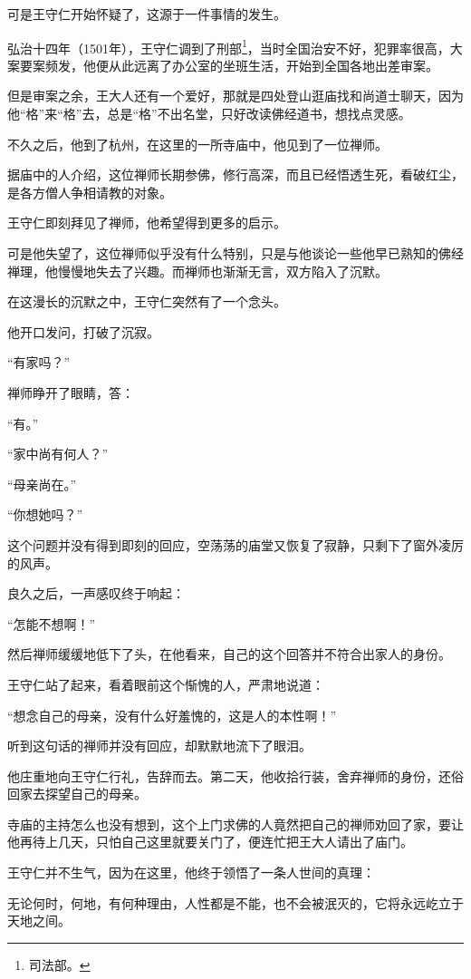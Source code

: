 \begin{multicols}{\theparacolNo}
可是王守仁开始怀疑了，这源于一件事情的发生。

弘治十四年（1501年），王守仁调到了刑部\footnote{司法部。}，当时全国治安不好，犯罪率很高，大案要案频发，他便从此远离了办公室的坐班生活，开始到全国各地出差审案。

但是审案之余，王大人还有一个爱好，那就是四处登山逛庙找和尚道士聊天，因为他“格”来“格”去，总是“格”不出名堂，只好改读佛经道书，想找点灵感。

不久之后，他到了杭州，在这里的一所寺庙中，他见到了一位禅师。

据庙中的人介绍，这位禅师长期参佛，修行高深，而且已经悟透生死，看破红尘，是各方僧人争相请教的对象。

王守仁即刻拜见了禅师，他希望得到更多的启示。

可是他失望了，这位禅师似乎没有什么特别，只是与他谈论一些他早已熟知的佛经禅理，他慢慢地失去了兴趣。而禅师也渐渐无言，双方陷入了沉默。

在这漫长的沉默之中，王守仁突然有了一个念头。

他开口发问，打破了沉寂。

“有家吗？”

禅师睁开了眼睛，答：

“有。”

“家中尚有何人？”

“母亲尚在。”

“你想她吗？”

这个问题并没有得到即刻的回应，空荡荡的庙堂又恢复了寂静，只剩下了窗外凌厉的风声。

良久之后，一声感叹终于响起：

“怎能不想啊！”

然后禅师缓缓地低下了头，在他看来，自己的这个回答并不符合出家人的身份。

王守仁站了起来，看着眼前这个惭愧的人，严肃地说道：

“想念自己的母亲，没有什么好羞愧的，这是人的本性啊！”

听到这句话的禅师并没有回应，却默默地流下了眼泪。

他庄重地向王守仁行礼，告辞而去。第二天，他收拾行装，舍弃禅师的身份，还俗回家去探望自己的母亲。

寺庙的主持怎么也没有想到，这个上门求佛的人竟然把自己的禅师劝回了家，要让他再待上几天，只怕自己这里就要关门了，便连忙把王大人请出了庙门。

王守仁并不生气，因为在这里，他终于领悟了一条人世间的真理：

无论何时，何地，有何种理由，人性都是不能，也不会被泯灭的，它将永远屹立于天地之间。


\end{multicols}
